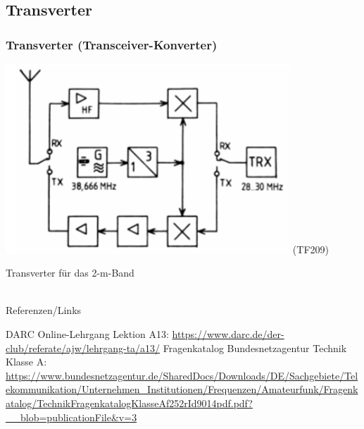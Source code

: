\subsection{Transverter}

\begin{frame}
    \frametitle{Transverter (Transceiver-Konverter)}

    \begin{center}
        \includegraphics[width=0.8\textwidth,height=.7\textheight,keepaspectratio]{a13/TF209.png}
	{\tiny (TF209)}
    \end{center}

    Transverter für das 2-m-Band

\end{frame}

\renewcommand{\refname}{Referenzen}

\hypertarget{refs}{}
\textcolor{white}{} \\ %
\Large Referenzen/Links
\footnotesize

\begin{thebibliography}{}
      DARC Online-Lehrgang Lektion A13:
                    \url{https://www.darc.de/der-club/referate/ajw/lehrgang-ta/a13/}
     Fragenkatalog Bundesnetzagentur Technik Klasse A:\\
    \url{https://www.bundesnetzagentur.de/SharedDocs/Downloads/DE/Sachgebiete/Telekommunikation/Unternehmen_Institutionen/Frequenzen/Amateurfunk/Fragenkatalog/TechnikFragenkatalogKlasseAf252rId9014pdf.pdf?__blob=publicationFile&v=3}
\end{thebibliography}


